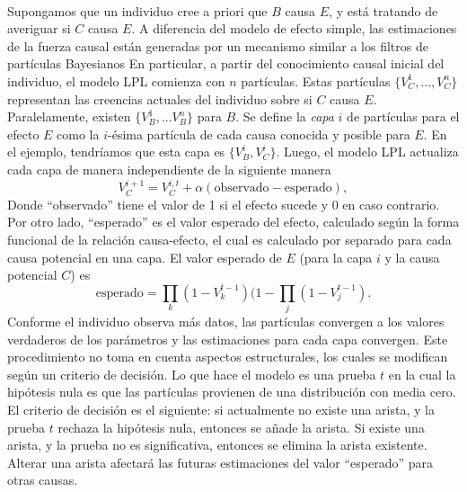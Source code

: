 \documentclass[11pt]{article}
\theoremstyle{plain}
\begin{document}
\\
Supongamos que un individuo cree a priori que $B$ causa $E$, y está tratando de averiguar si $C$ causa $E$. A diferencia del modelo de efecto simple, las estimaciones de la fuerza causal están generadas por un mecanismo similar a los filtros de partículas Bayesianos
En particular, a partir del conocimiento causal inicial del individuo, el modelo LPL comienza con $n$ partículas. Estas partículas $\{V_C^1,...,V_C^n \}$ representan las creencias actuales del individuo sobre si $C$ causa $E$. Paralelamente, existen $\{ V_B^1,...V_B^n \}$ para $B$. Se define la \textit{capa} $i$ de partículas para el efecto $E$ como la $i$-ésima partícula de cada causa conocida y posible para $E$. En el ejemplo, tendríamos que esta capa es $\{ V_B^i, V_C^i \}$. Luego, el modelo LPL actualiza cada capa de manera independiente de la siguiente manera
\[ V_C^{i+1} = V_C^{i,t} + \alpha ( \textrm{observado} - \textrm{esperado}), \]
Donde “observado” tiene el valor de 1 si el efecto sucede y 0 en caso contrario. Por otro lado, “esperado” es el valor esperado del efecto, calculado según la forma funcional de la relación causa-efecto, el cual es calculado por separado para cada causa potencial en una capa. El valor esperado de $E$ (para la capa $i$ y la causa potencial $C$) es
\[ \textrm{esperado} = \prod_{k} (1-V_k^{t-1})(1 - \prod_j (1- V_j^{t-1}).\]
Conforme el individuo observa más datos, las partículas convergen a los valores verdaderos de los parámetros y las estimaciones para cada capa convergen. Este procedimiento no toma en cuenta aspectos estructurales, los cuales se modifican según un criterio de decisión. Lo que hace el modelo es una prueba $t$ en la cual la hipótesis nula es que las partículas provienen de una distribución con media cero. El criterio de decisión es el siguiente: si actualmente no existe una arista, y la prueba $t$ rechaza la hipótesis nula, entonces se añade la arista. Si existe una arista, y la prueba no es significativa, entonces se elimina la arista existente. Alterar una arista afectará las futuras estimaciones del valor “esperado” para otras causas.\\
\\
\end{document}

